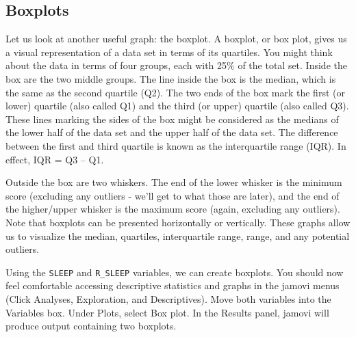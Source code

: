 \documentclass[
]{book}
\begin{document}
\hypertarget{boxplots-1}{%
\subsection{Boxplots}\label{boxplots-1}}

Let us look at another useful graph: the boxplot. A boxplot, or box plot, gives us a visual representation of a data set in terms of its quartiles. You might think about the data in terms of four groups, each with 25\% of the total set. Inside the box are the two middle groups. The line inside the box is the median, which is the same as the second quartile (Q2). The two ends of the box mark the first (or lower) quartile (also called Q1) and the third (or upper) quartile (also called Q3). These lines marking the sides of the box might be considered as the medians of the lower half of the data set and the upper half of the data set. The difference between the first and third quartile is known as the interquartile range (IQR). In effect, IQR = Q3 -- Q1.

Outside the box are two whiskers. The end of the lower whisker is the minimum score (excluding any outliers - we'll get to what those are later), and the end of the higher/upper whisker is the maximum score (again, excluding any outliers). Note that boxplots can be presented horizontally or vertically. These graphs allow us to visualize the median, quartiles, interquartile range, range, and any potential outliers.

Using the \texttt{SLEEP} and \texttt{R\_SLEEP} variables, we can create boxplots. You should now feel comfortable accessing descriptive statistics and graphs in the jamovi menus (Click {Analyses}, {Exploration}, and {Descriptives}). Move both variables into the Variables box. Under {Plots}, select Box plot. In the Results panel, jamovi will produce output containing two boxplots.
\end{document}
